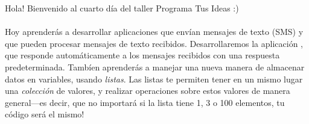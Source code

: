 Hola! Bienvenido al cuarto día del taller Programa Tus Ideas :)

\paragraph{}
Hoy aprenderás a desarrollar aplicaciones que envían mensajes de texto
(SMS) y que pueden procesar mensajes de texto
recibidos. Desarrollaremos la aplicación ,
que responde automáticamente a los mensajes recibidos con una
respuesta predeterminada. Tambíen aprenderás a manejar una nueva
manera de almacenar datos en variables, usando \emph{listas}. Las
listas te permiten tener en un mismo lugar una \emph{colección} de
valores, y realizar operaciones sobre estos valores de manera
general---es decir, que no importará si la lista tiene 1, 3 o 100
elementos, tu código será el mismo!
